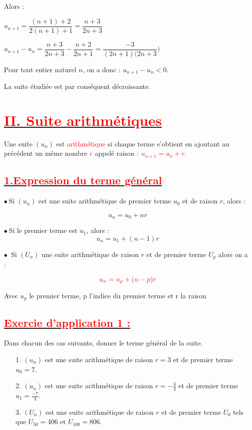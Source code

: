 \documentclass[12pt]{article}
\begin{document}
Alors :

$u_{n+1}=\dfrac{(n+1)+2}{2(n+1)+1}=\dfrac{n+3}{2n+3}$
	
$u_{n+1}-u_{n}=\dfrac{n+3}{2n+3}-\dfrac{n+2}{2n+1}=\dfrac{-3}{(2n+1)(2n+3})$
	
Pour tout entier naturel $n$, on a donc : $u_{n+1}-u_{n} < 0.$
	
La suite étudiée est par conséquent décroissante.
\section*{\underline{\textbf{\textcolor{red}{II. Suite arithmétiques}}}}
Une suite $\left(u_{n}\right)$ est \textcolor{red}{arithmétique} si chaque terme s'obtient en ajoutant au précédent un même nombre \textcolor{red}{$r$} appelé raison : 
\textcolor{red}{$u_{n+1}=u_{n}+r.$} 
\subsection*{\underline{\textbf{\textcolor{red}{1.Expression du terme général}}}}		
$\bullet\ \text{Si }\left(u_{n}\right)$ est une suite arithmétique de premier terme $u_{0}$ et de raison $r$, alors :
	
$$u_{n}=u_{0}+nr$$
	
$\bullet\ $Si le premier terme est $u_{1}$, alors :
$$u_{n}=u_{1}+(n-1)r$$

$\bullet\ $ Si $(U_n)$ une suite arithmétique de raison $r$ et de premier terme $U_{p}$ alors on a : 
\begin{mdframed}[linecolor=red] %
    \[
    \color{red} u_{n} = u_{p} + (n-p)r
    \]
\end{mdframed}
Avec $u_{p}$ le premier terme, p l'indice du premier terme et r la raison
\subsection*{\underline{\textbf{\textcolor{red}{Exercie d'application 1 :}}}}
Dans chacun des cas suivants, donner le terme général de la suite.
\begin{itemize}
\item[1.]$(u_n)$ est une suite arithmétique de raison $r = 3$ et de premier terme $u_{0}= 7$.
\item[2.]$(u_n)$ est une suite arithmétique de raison $r=-\frac{3}{4}$ et de premier terme 
$u_{1}=\frac{-7}{4}$.
\item[3.] $(U_n)$ est une suite arithmétique de raison $r$ et de premier terme $U_{0}$ tels que $U_{50} = 406$ et $U_{100} = 806$.
\end{itemize}
\end{document}
